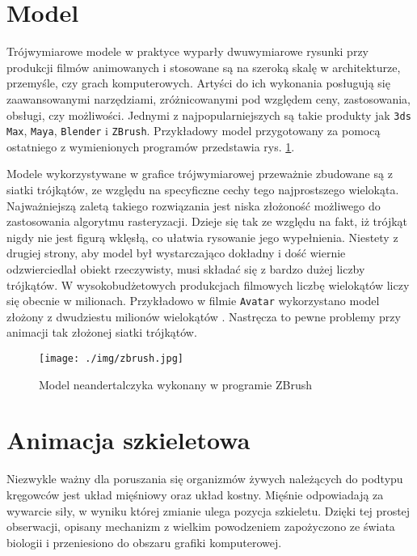 \documentclass[11pt]{mwrep}
\begin{document}
  \section{Model}
Trójwymiarowe modele w praktyce wyparły dwuwymiarowe rysunki przy produkcji filmów animowanych i stosowane są na szeroką skalę w architekturze, przemyśle, czy grach komputerowych. Artyści do ich wykonania posługują się zaawansowanymi narzędziami, zróżnicowanymi pod względem ceny, zastosowania, obsługi, czy możliwości. Jednymi z najpopularniejszych są takie produkty jak \texttt{3ds Max}, \texttt{Maya}, \texttt{Blender} i \texttt{ZBrush}. Przykładowy model przygotowany za pomocą ostatniego z wymienionych programów przedstawia rys. \ref{img:zbrush}.

Modele wykorzystywane w grafice trójwymiarowej przeważnie zbudowane są z siatki trójkątów, ze względu na specyficzne cechy tego najprostszego wielokąta. Najważniejszą zaletą takiego rozwiązania jest niska złożoność możliwego do zastosowania algorytmu rasteryzacji. Dzieje się tak ze względu na fakt, iż trójkąt nigdy nie jest figurą wklęsłą, co ułatwia rysowanie jego wypełnienia. Niestety z drugiej strony, aby model był wystarczająco dokładny i dość wiernie odzwierciedlał obiekt rzeczywisty, musi składać się z bardzo dużej liczby trójkątów. W wysokobudżetowych produkcjach filmowych liczbę wielokątów liczy się obecnie w milionach. Przykładowo w filmie \texttt{Avatar} wykorzystano model złożony z dwudziestu milionów wielokątów \cite{avatar}. Nastręcza to pewne problemy przy animacji tak złożonej siatki trójkątów.

    \begin{figure}
  \centering
    \texttt{[image: ./img/zbrush.jpg]}
  \caption{Model neandertalczyka wykonany w programie ZBrush \cite{zbrush}}
  \label{img:zbrush}
  \end{figure}

\pagebreak

  \section{Animacja szkieletowa}

Niezwykle ważny dla poruszania się organizmów żywych należących do podtypu kręgowców jest układ mięśniowy oraz układ kostny. Mięśnie odpowiadają za wywarcie siły, w wyniku której zmianie ulega pozycja szkieletu. Dzięki tej prostej obserwacji, opisany mechanizm z wielkim powodzeniem zapożyczono ze świata biologii i przeniesiono do obszaru grafiki komputerowej.
\end{document}

